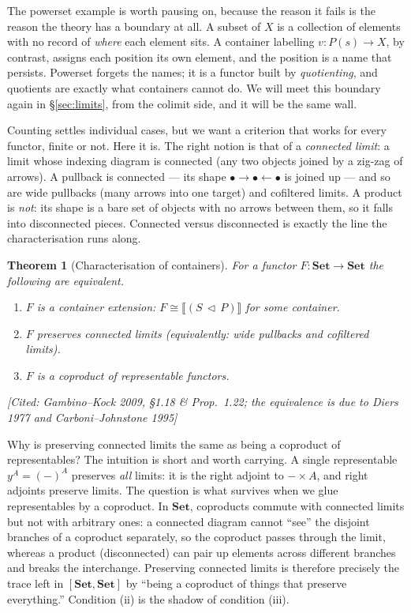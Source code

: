 \documentclass[11pt]{article}
\theoremstyle{plain}
\newtheorem{theorem}{Theorem}[section]
\theoremstyle{definition}
\newcommand{\Set}{\mathbf{Set}}
\newcommand{\iso}{\cong}
\newcommand{\ext}[1]{\llbracket #1 \rrbracket}
\newcommand{\cont}[2]{(#1\,\triangleleft\,#2)}
\newcommand{\y}{y}
\newcommand{\prov}[1]{\hfill\textsf{[#1]}}
\begin{document}
The powerset example is worth pausing on, because the reason it fails is the reason
the theory has a boundary at all. A subset of $X$ is a collection of elements with no
record of \emph{where} each element sits. A container labelling $v\colon P(s)\to X$, by
contrast, assigns each position its own element, and the position is a name that
persists. Powerset forgets the names; it is a functor built by \emph{quotienting}, and
quotients are exactly what containers cannot do. We will meet this boundary again in
\S\ref{sec:limits}, from the colimit side, and it will be the same wall.

Counting settles individual cases, but we want a criterion that works for every
functor, finite or not. Here it is. The right notion is that of a \emph{connected
limit}: a limit whose indexing diagram is connected (any two objects joined by a
zig-zag of arrows). A pullback is connected --- its shape
$\bullet\to\bullet\leftarrow\bullet$ is joined up --- and so are wide pullbacks (many
arrows into one target) and cofiltered limits. A product is \emph{not}: its shape is a
bare set of objects with no arrows between them, so it falls into disconnected pieces.
Connected versus disconnected is exactly the line the characterisation runs along.

\begin{theorem}[Characterisation of containers]\label{thm:char}
For a functor $F\colon\Set\to\Set$ the following are equivalent.
\begin{enumerate}[label=\textup{(\roman*)}]
\item $F$ is a container extension: $F\iso\ext{\cont SP}$ for some container.
\item $F$ preserves connected limits (equivalently: wide pullbacks and cofiltered
      limits).
\item $F$ is a coproduct of representable functors.
\end{enumerate}
\prov{Cited: Gambino--Kock 2009, \S1.18 \& Prop.~1.22; the equivalence is due to
Diers 1977 and Carboni--Johnstone 1995}
\end{theorem}

Why is preserving connected limits the same as being a coproduct of representables?
The intuition is short and worth carrying. A single representable $\y^A=(-)^A$
preserves \emph{all} limits: it is the right adjoint to $-\times A$, and right adjoints
preserve limits. The
question is what survives when we glue representables by a coproduct. In $\Set$,
coproducts commute with connected limits but not with arbitrary ones: a connected
diagram cannot ``see'' the disjoint branches of a coproduct separately, so the
coproduct passes through the limit, whereas a product (disconnected) can pair up
elements across different branches and breaks the interchange. Preserving connected
limits is therefore precisely the trace left in $[\Set,\Set]$ by ``being a coproduct
of things that preserve everything.'' Condition (ii) is the shadow of condition (iii).
\end{document}
